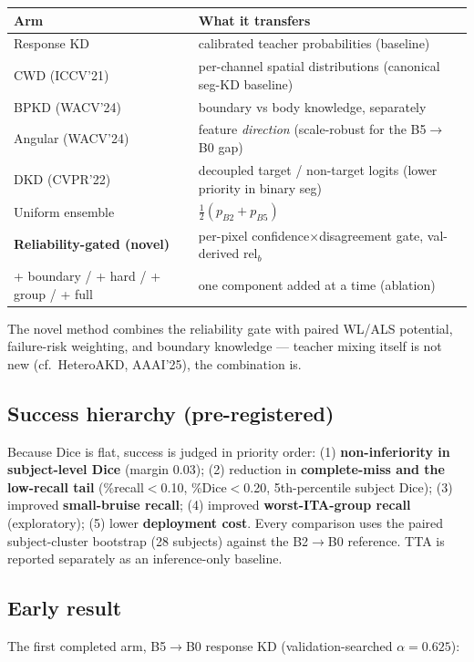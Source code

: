 \documentclass[11pt]{article}
\begin{document}
\begin{center}\small
\begin{tabular}{l l}
\toprule
Arm & What it transfers \\
\midrule
Response KD & calibrated teacher probabilities (baseline) \\
CWD (ICCV'21) & per-channel spatial distributions (canonical seg-KD baseline) \\
BPKD (WACV'24) & boundary vs body knowledge, separately \\
Angular (WACV'24) & feature \emph{direction} (scale-robust for the B5$\to$B0 gap) \\
DKD (CVPR'22) & decoupled target / non-target logits (lower priority in binary seg) \\
Uniform ensemble & $\tfrac12(p_{B2}+p_{B5})$ \\
\textbf{Reliability-gated (novel)} & per-pixel confidence$\times$disagreement gate, val-derived $\mathrm{rel}_b$ \\
\quad + boundary / + hard / + group / + full & one component added at a time (ablation) \\
\bottomrule
\end{tabular}
\end{center}

The novel method combines the reliability gate with paired WL/ALS potential, failure-risk
weighting, and boundary knowledge --- teacher mixing itself is not new (cf.\ HeteroAKD, AAAI'25),
the combination is.

\subsection{Success hierarchy (pre-registered)}
Because Dice is flat, success is judged in priority order:
(1) \textbf{non-inferiority in subject-level Dice} (margin 0.03);
(2) reduction in \textbf{complete-miss and the low-recall tail} (\%recall$<$0.10, \%Dice$<$0.20,
5th-percentile subject Dice);
(3) improved \textbf{small-bruise recall};
(4) improved \textbf{worst-ITA-group recall} (exploratory);
(5) lower \textbf{deployment cost}. Every comparison uses the paired subject-cluster bootstrap
(28 subjects) against the B2$\to$B0 reference. TTA is reported separately as an inference-only
baseline.

\subsection{Early result}
The first completed arm, B5$\to$B0 response KD (validation-searched $\alpha=0.625$):
\end{document}
